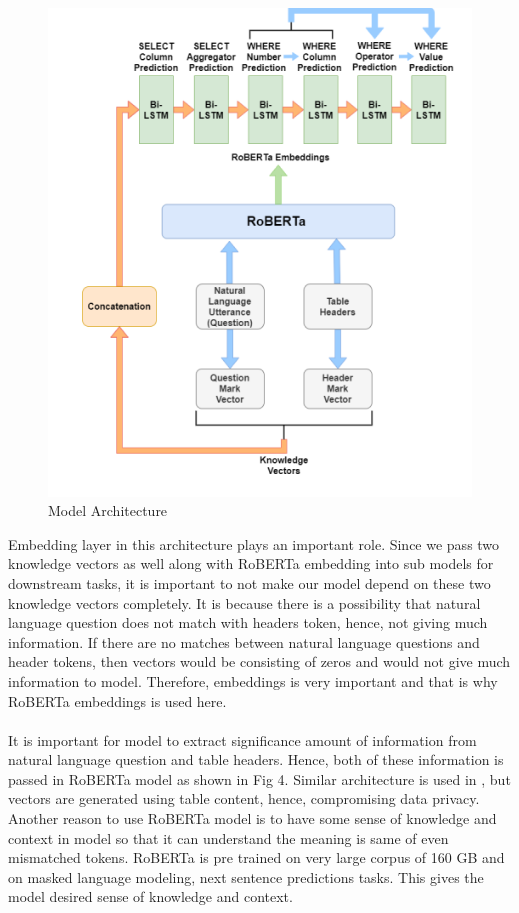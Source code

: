 \documentclass[12pt]{article}
\begin{document}
\begin{figure}[H]
    \includegraphics[width=350pt]{model}
    \caption{Model Architecture}
    \label{fig:Model Architecture}
\end{figure}

Embedding layer in this architecture plays an important role. Since we pass two knowledge vectors as well along with RoBERTa embedding into sub models for downstream tasks, it is important to not make our model depend on these two knowledge vectors completely. It is because there is a possibility that natural language question does not match with headers token, hence, not giving much information. If there are no matches between natural language questions and header tokens, then vectors would be consisting of zeros and would not give much information to model. Therefore, embeddings is very important and that is why RoBERTa embeddings is used here. 
\\
\\
It is important for model to extract significance amount of information from natural language question and table headers. Hence, both of these information is passed in RoBERTa model as shown in Fig 4. Similar architecture is used in \cite{guo2019content}, but vectors are generated using table content, hence, compromising data privacy. Another reason to use RoBERTa model is to have some sense of knowledge and context in model so that it can understand the meaning is same of even mismatched tokens. RoBERTa is pre trained on very large corpus of 160 GB and on masked language modeling, next sentence predictions tasks. This gives the model desired sense of knowledge and context. 
\end{document}
